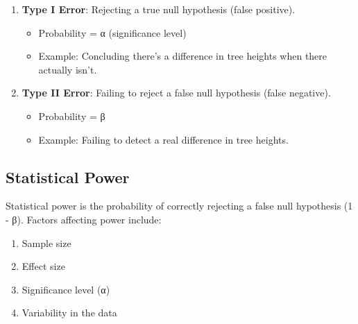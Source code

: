 \documentclass[
  letterpaper,
]{book}
\providecommand{\tightlist}{%
  \setlength{\itemsep}{0pt}\setlength{\parskip}{0pt}}
\begin{document}
\begin{enumerate}
\def\labelenumi{\arabic{enumi}.}
\tightlist
\item
  \textbf{Type I Error}: Rejecting a true null hypothesis (false
  positive).

  \begin{itemize}
  \tightlist
  \item
    Probability = α (significance level)
  \item
    Example: Concluding there's a difference in tree heights when there
    actually isn't.
  \end{itemize}
\item
  \textbf{Type II Error}: Failing to reject a false null hypothesis
  (false negative).

  \begin{itemize}
  \tightlist
  \item
    Probability = β
  \item
    Example: Failing to detect a real difference in tree heights.
  \end{itemize}
\end{enumerate}

\subsection{Statistical Power}\label{statistical-power}

Statistical power is the probability of correctly rejecting a false null
hypothesis (1 - β). Factors affecting power include:

\begin{enumerate}
\def\labelenumi{\arabic{enumi}.}
\tightlist
\item
  Sample size
\item
  Effect size
\item
  Significance level (α)
\item
  Variability in the data
\end{enumerate}
\end{document}

